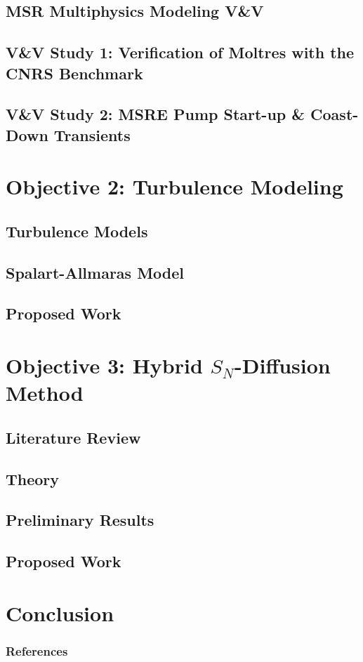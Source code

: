 \documentclass[9pt]{beamer}
\begin{document}
\subsection{MSR Multiphysics Modeling V\&V}

\subsection{V\&V Study 1: Verification of Moltres with the CNRS Benchmark}

\subsection{V\&V Study 2: MSRE Pump Start-up \& Coast-Down Transients}


\section{Objective 2: Turbulence Modeling}
\subsection{Turbulence Models}

\subsection{Spalart-Allmaras Model}

\subsection{Proposed Work}


\section{Objective 3: Hybrid $S_N$-Diffusion Method}
\subsection{Literature Review}

\subsection{Theory}

\subsection{Preliminary Results}

\subsection{Proposed Work}


\section{Conclusion}

\begin{frame}[allowframebreaks]
  \frametitle{References}
  
  {\tiny  }

\end{frame}

\end{document}
